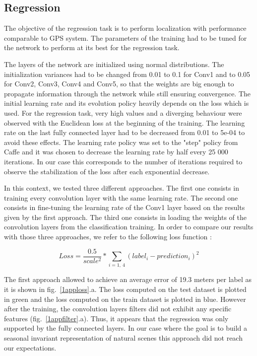 \subsection{Regression}
\label{sec:results-regression}
The objective of the regression task is to perform localization with performance comparable to GPS system. The parameters of the training had to be tuned for the network to perform at its best for the regression task.

The layers of the network are initialized using normal distributions. The initialization variances had to be changed from 0.01 to 0.1 for Conv1 and to 0.05 for Conv2, Conv3, Conv4 and Conv5, so that the weights are big enough to propagate information through the network while still ensuring convergence.
The initial learning rate and its evolution policy heavily depends on the loss which is used. For the regression task, very high values and a diverging behaviour were observed with the Euclidean loss at the beginning of the training. The learning rate on the last fully connected layer had to be decreased from 0.01 to 5e-04 to avoid these effects. The learning rate policy was set to the "step" policy from Caffe and it was chosen to decrease the learning rate by half every 25 000 iterations. In our case this corresponds to the number of iterations required to observe the stabilization of the loss after each exponential decrease.

In this context, we tested three different approaches.  The first one consists in training every convolution layer with the same learning rate. The second one consists in fine-tuning the learning rate of the Conv1 layer based on the results given by the first approach. The third one consists in loading the weights of the convolution layers from the classification training. In order to compare our results with those three approaches, we refer to the following loss function :

\begin{equation} 
Loss = \frac{0.5}{scale^{2}}*\sum_{i=1,\ 4}(label_{i}-prediction_{i})^{2}
\end{equation}

The first approach allowed to achieve an average error of 19.3 meters per label as it is shown in fig.~\ref{1apploss}.a. The loss computed on the test dataset is plotted in green and the loss computed on the train dataset is plotted in blue. However after the training, the convolution layers filters did not exhibit any specific features (fig.~\ref{1appfilter}.a). Thus, it appears that the regression was only supported by the fully connected layers. In our case where the goal is to build a seasonal invariant representation of natural scenes this approach did not reach our expectations. 

